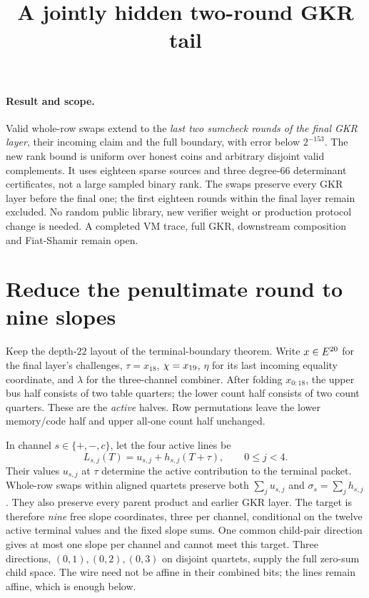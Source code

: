 \documentclass[11pt]{article}
\title{A jointly hidden two-round GKR tail}
\author{}
\date{}
\begin{document}
\maketitle
\vspace{-2em}

\paragraph{Result and scope.} Valid whole-row swaps extend  to the \emph{last two sumcheck rounds of the final GKR layer}, their incoming claim and the full boundary, with error below $2^{-153}$. The new rank bound is uniform over honest coins and arbitrary disjoint valid complements. It uses eighteen sparse sources and three degree-$66$ determinant certificates, not a large sampled binary rank. The swaps preserve every GKR layer before the final one; the first eighteen rounds within the final layer remain excluded. No random public library, new verifier weight or production protocol change is needed. A completed VM trace, full GKR, downstream composition and Fiat-Shamir remain open.

\section{Reduce the penultimate round to nine slopes}

Keep the depth-$22$ layout of the terminal-boundary theorem. Write $x\in E^{20}$ for the final layer's challenges, $\tau=x_{18}$, $\chi=x_{19}$, $\eta$ for its last incoming equality coordinate, and $\lambda$ for the three-channel combiner. After folding $x_{0:18}$, the upper bus half consists of two table quarters; the lower count half consists of two count quarters. These are the \emph{active} halves. Row permutations leave the lower memory/code half and upper all-one count half unchanged.

In channel $s\in\{+,-,c\}$, let the four active lines be
\[
 L_{s,j}(T)=u_{s,j}+h_{s,j}(T+\tau),\qquad 0\le j<4.
\]
Their values $u_{s,j}$ at $\tau$ determine the active contribution to the terminal packet. Whole-row swaps within aligned quartets preserve both $\sum_j u_{s,j}$ and $\sigma_s=\sum_j h_{s,j}$. They also preserve every parent product and earlier GKR layer. The target is therefore \emph{nine} free slope coordinates, three per channel, conditional on the twelve active terminal values and the fixed slope sums. One common child-pair direction gives at most one slope per channel and cannot meet this target. Three directions, $(0,1),(0,2),(0,3)$ on disjoint quartets, supply the full zero-sum child space. The wire need not be affine in their combined bits; the lines remain affine, which is enough below.
\end{document}
